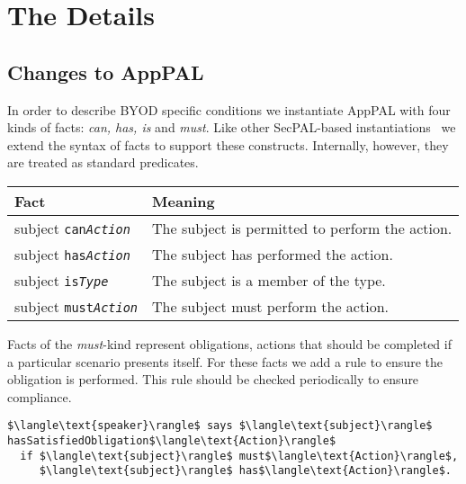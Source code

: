 \documentclass{easychair}
\begin{document}
\section{The Details}
\label{sec:details}

\subsection{Changes to AppPAL}

In order to describe BYOD specific conditions we instantiate AppPAL with four kinds of facts: \emph{can, has, is} and \emph{must}.
Like other SecPAL-based instantiations~\cite{becker_framework_2009,aziz_secpal4dsa:_2011} we extend the syntax of facts to support these constructs.
Internally, however, they are treated as standard predicates.

\begin{center}
  \footnotesize\sffamily
  \newcommand{\predicate}[3]{#1 \texttt{#2\textit{#3}}}
  \begin{tabular}{l l}
    \toprule
    Fact                              & Meaning                                         \\
    \midrule
    \predicate{subject}{can}{Action}  & The subject is permitted to perform the action. \\
    \predicate{subject}{has}{Action}  & The subject has performed the action.           \\
    \predicate{subject}{is}{Type}     & The subject is a member of the type.            \\
    \predicate{subject}{must}{Action} & The subject must perform the action.            \\
    \bottomrule
  \end{tabular}
\end{center}

Facts of the \emph{must}-kind represent obligations, actions that should be completed if a particular scenario presents itself.
For these facts we add a rule to ensure the obligation is performed.
This rule should be checked periodically to ensure compliance.
\begin{lstlisting}
$\langle\text{speaker}\rangle$ says $\langle\text{subject}\rangle$ hasSatisfiedObligation$\langle\text{Action}\rangle$
  if $\langle\text{subject}\rangle$ must$\langle\text{Action}\rangle$,
     $\langle\text{subject}\rangle$ has$\langle\text{Action}\rangle$.
\end{lstlisting}
\end{document}
